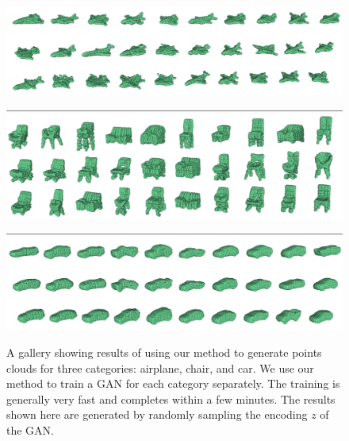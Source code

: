 \begin{figure}[t]
\includegraphics[width=1.0\linewidth]{PCAGAN/images/gallery/airplanes.png}
\includegraphics[width=1.0\linewidth]{PCAGAN/images/hline.png}
\includegraphics[width=1.0\linewidth]{PCAGAN/images/gallery/chairs.png}
\includegraphics[width=1.0\linewidth]{PCAGAN/images/hline.png}
\includegraphics[width=1.0\linewidth]{PCAGAN/images/gallery/cars.png}
\vspace{-16pt}
\caption{\small \label{fig:gallery} A gallery showing results of using our method to generate points clouds for three categories: airplane, chair, and car. We use our method to train a GAN for each category separately. The training is generally very fast and completes within a few minutes. The results shown here are generated by randomly sampling the encoding $z$ of the GAN.}
\vspace{-12pt}
\end{figure}



